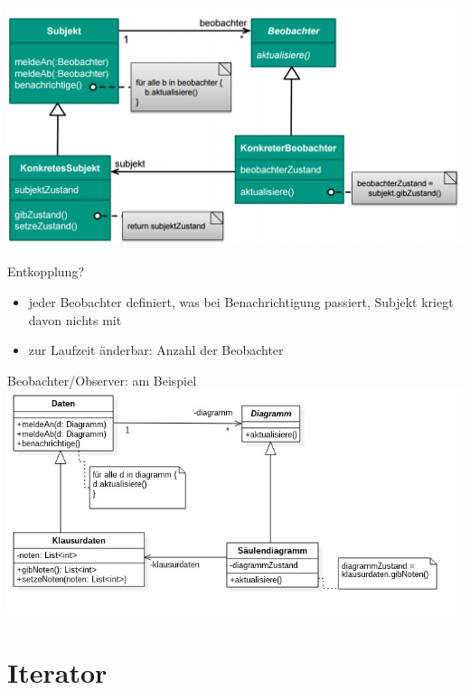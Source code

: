 \documentclass[18pt]{beamer}
\begin{document}
	\begin{frame}{}
		\includegraphics[keepaspectratio, width=\textwidth, height=\textheight]{pics/tut3/obs.png}
		\pause
		\begin{block}{Entkopplung?}
		\begin{itemize}
			\pause 
			\item jeder Beobachter definiert, was bei Benachrichtigung passiert, Subjekt kriegt davon nichts mit \pause
			\item zur Laufzeit änderbar: Anzahl der Beobachter
		\end{itemize}
		\end{block}
	\end{frame}

	\begin{frame}{Beobachter/Observer: am Beispiel}
		\includegraphics[keepaspectratio, width=\textwidth, height=\textheight]{diagrams/interview/observer_example.jpg}
	\end{frame}

\section{Iterator}
\end{document}

